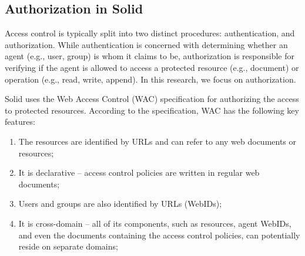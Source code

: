 \documentclass[sigconf]{acmart}
\begin{document}
\subsection{Authorization in Solid}

Access control is typically split into two distinct procedures: authentication, and authorization. While authentication is concerned with determining whether an agent (e.g., user, group) is whom it claims to be, authorization is responsible for verifying if the agent is allowed to access a protected resource (e.g., document) or operation (e.g., read, write, append). In this research, we focus on authorization.

Solid uses the Web Access Control (WAC) specification for authorizing the access to protected resources. According to the specification, WAC has the following key features:

\begin{enumerate}
\item The resources are identified by URLs and can refer to any web documents or resources;
\item It is declarative -- access control policies are written in regular web documents;
\item Users and groups are also identified by URLs (WebIDs);
\item It is cross-domain -- all of its components, such as resources, agent WebIDs, and even the documents containing the access control policies, can potentially reside on separate domains;
\end{enumerate}
\end{document}
